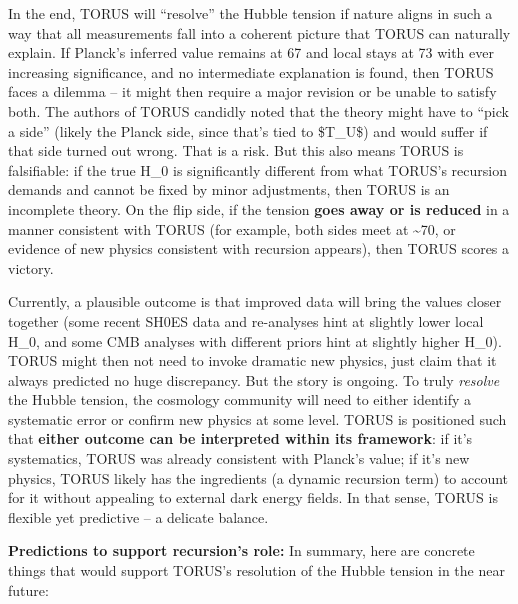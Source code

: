 \documentclass[
]{article}
\begin{document}
{In the end, TORUS will ``resolve'' the Hubble tension if nature aligns
in such a way that all measurements fall into a coherent picture that
TORUS can naturally explain. If Planck's inferred value remains at 67
and local stays at 73 with ever increasing significance, and no
intermediate explanation is found, then TORUS faces a dilemma -- it
might then require a major revision or be unable to satisfy both. The
authors of TORUS candidly noted that the theory might have to ``pick a
side'' (likely the Planck side, since that's tied to \$T\_U\$) and would
suffer if that side turned out wrong\hspace{0pt}. That is a risk. But
this also means TORUS is falsifiable: if the true
H_{0}{} is significantly
different from what TORUS's recursion demands and cannot be fixed by
minor adjustments, then TORUS is an incomplete theory. On the flip side,
if the tension \textbf{goes away or is reduced} in a manner consistent
with TORUS (for example, both sides meet at \textasciitilde70, or
evidence of new physics consistent with recursion appears), then TORUS
scores a victory\hspace{0pt}.

Currently, a plausible outcome is that improved data will bring the
values closer together (some recent SH0ES data and re-analyses hint at
slightly lower local
H_{0}, and some CMB
analyses with different priors hint at slightly higher
H_{0}). TORUS might then
not need to invoke dramatic new physics, just claim that it always
predicted no huge discrepancy. But the story is ongoing. To truly
\emph{resolve} the Hubble tension, the cosmology community will need to
either identify a systematic error or confirm new physics at some level.
TORUS is positioned such that \textbf{either outcome can be interpreted
within its framework}: if it's systematics, TORUS was already consistent
with Planck's value; if it's new physics, TORUS likely has the
ingredients (a dynamic recursion term) to account for it without
appealing to external dark energy fields. In that sense, TORUS is
flexible yet predictive -- a delicate balance.

\textbf{Predictions to support recursion's role:} In summary, here are
concrete things that would support TORUS's resolution of the Hubble
tension in the near future:

}
\end{document}

